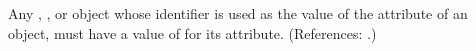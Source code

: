 Any \Compartment, \Species, \Parameter or \SpeciesReference object whose
identifier is used as the value of the attribute  of an
\EventAssignment object, must have a value of  for its
 attribute.  (References: .)
